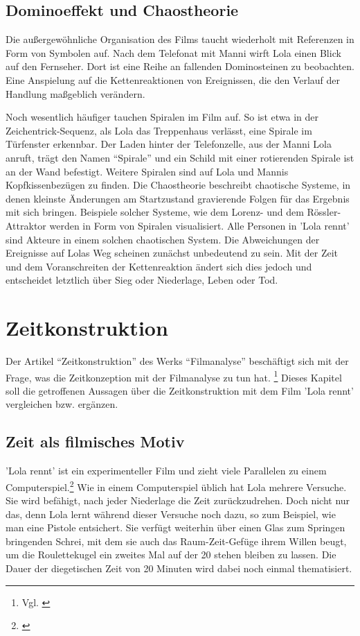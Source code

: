 \subsection{Dominoeffekt und Chaostheorie}

Die außergewöhnliche Organisation des Films taucht wiederholt mit Referenzen in Form von Symbolen auf. Nach dem Telefonat mit Manni wirft Lola einen Blick auf den Fernseher. Dort ist eine Reihe an fallenden Dominosteinen zu beobachten. Eine Anspielung auf die Kettenreaktionen von Ereignissen, die den Verlauf der Handlung maßgeblich verändern.

Noch wesentlich häufiger tauchen Spiralen im Film auf. So ist etwa in der Zeichentrick-Sequenz, als Lola das Treppenhaus verlässt, eine Spirale im Türfenster erkennbar. Der Laden hinter der Telefonzelle, aus der Manni Lola anruft, trägt den Namen "`Spirale"' und ein Schild mit einer rotierenden Spirale ist an der Wand befestigt. Weitere Spiralen sind auf Lola und Mannis Kopfkissenbezügen zu finden. Die Chaostheorie beschreibt chaotische Systeme, in denen kleinste Änderungen am Startzustand gravierende Folgen für das Ergebnis mit sich bringen. Beispiele solcher Systeme, wie dem Lorenz- und dem Rössler-Attraktor werden in Form von Spiralen visualisiert. Alle Personen in 'Lola rennt' sind Akteure in einem solchen chaotischen System. Die Abweichungen der Ereignisse auf Lolas Weg scheinen zunächst unbedeutend zu sein. Mit der Zeit und dem Voranschreiten der Kettenreaktion ändert sich dies jedoch und entscheidet letztlich über Sieg oder Niederlage, Leben oder Tod.

\section{Zeitkonstruktion}

Der Artikel "`Zeitkonstruktion"' des Werks "`Filmanalyse"' beschäftigt sich mit der Frage, was die Zeitkonzeption mit der Filmanalyse zu tun hat.  \footnote{Vgl. \cite[S. 204]{keutzer2014filmanalyse}} Dieses Kapitel soll die getroffenen Aussagen über die Zeitkonstruktion mit dem Film 'Lola rennt' vergleichen bzw. ergänzen.

\subsection{Zeit als filmisches Motiv}
\label{lab:ZeitAlsFilmischesMotiv} 

'Lola rennt' ist ein experimenteller Film und zieht viele Parallelen zu einem Computerspiel.\footnote{\cite{AllesBlossEinSpiel}} Wie in einem Computerspiel üblich hat Lola mehrere Versuche. Sie wird befähigt, nach jeder Niederlage die Zeit zurückzudrehen. Doch nicht nur das, denn Lola lernt während dieser Versuche noch dazu, so zum Beispiel, wie man eine Pistole entsichert. Sie verfügt weiterhin über einen Glas zum Springen bringenden Schrei, mit dem sie auch das Raum-Zeit-Gefüge ihrem Willen beugt, um die Roulettekugel ein zweites Mal auf der 20 stehen bleiben zu lassen. Die Dauer der diegetischen Zeit von 20 Minuten wird dabei noch einmal thematisiert. 

